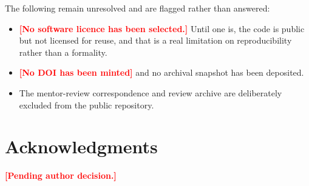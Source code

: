 \documentclass[11pt,a4paper]{article}
\theoremstyle{definition}
\theoremstyle{remark}
\newcommand{\pending}[1]{\textcolor{red}{\textbf{[#1]}}}
\begin{document}
The following remain unresolved and are flagged rather than answered:
\begin{itemize}\itemsep1pt
\item \pending{No software licence has been selected.} Until one is, the code is
      public but not licensed for reuse, and that is a real limitation on
      reproducibility rather than a formality.
\item \pending{No DOI has been minted} and no archival snapshot has been
      deposited.
\item The mentor-review correspondence and review archive are deliberately
      excluded from the public repository.
\end{itemize}

\section*{Acknowledgments}
\pending{Pending author decision.}

\appendix















\end{document}
